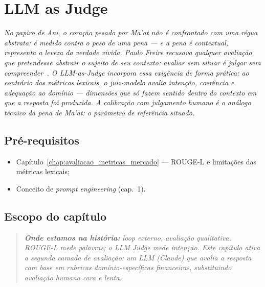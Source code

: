 \chapter{LLM as Judge}
\label{chap:llm_as_judge}

{\small\itshape\color{AccentGray}
No papiro de Ani, o cora\c{c}\~{a}o pesado por Ma'at n\~{a}o \'{e} confrontado com uma r\'{e}gua abstrata: \'{e} medido contra o peso de uma pena --- e a pena \'{e} contextual, representa a leveza da verdade vivida. Paulo Freire recusava qualquer avalia\c{c}\~{a}o que pretendesse abstrair o sujeito de seu contexto: avaliar sem situar \'{e} julgar sem compreender~\cite{freire1996autonomia}. O LLM-as-Judge incorpora essa exig\^{e}ncia de forma pr\'{a}tica: ao contr\'{a}rio das m\'{e}tricas lexicais, o juiz-modelo avalia inten\c{c}\~{a}o, coer\^{e}ncia e adequa\c{c}\~{a}o ao dom\'{i}nio --- dimens\~{o}es que s\'{o} fazem sentido dentro do contexto em que a resposta foi produzida. A calibra\c{c}\~{a}o com julgamento humano \'{e} o an\'{a}logo t\'{e}cnico da pena de Ma'at: o par\^{a}metro de refer\^{e}ncia situado.\par}
\vspace{0.6em}
\section{Pr\'e-requisitos}

\begin{itemize}[leftmargin=*]
  \item Cap\'itulo~\ref{chap:avaliacao_metricas_mercado} ---
        ROUGE-L e limita\c{c}\~oes das m\'etricas lexicais;
  \item Conceito de \textit{prompt engineering} (cap.~1).
\end{itemize}

\section{Escopo do cap\'itulo}

\begin{quote}\itshape
\textbf{Onde estamos na hist\'oria:} loop externo, avalia\c{c}\~ao
qualitativa. ROUGE-L mede palavras; o LLM Judge mede inten\c{c}\~ao.
Este cap\'itulo ativa a segunda camada de avalia\c{c}\~ao: um LLM
(Claude) que avalia a resposta com base em rubricas dom\'inio-espec\'ificas
financeiras, substituindo avalia\c{c}\~ao humana cara e lenta.
\end{quote}

